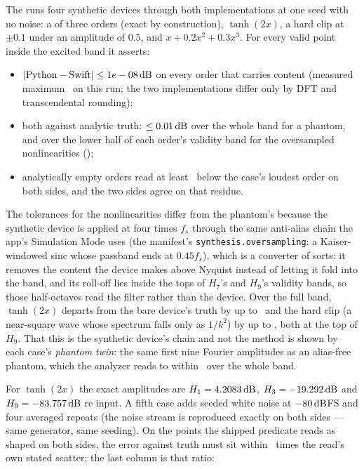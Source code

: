 \documentclass[11pt,a4paper]{article}
\begin{document}
The  runs four synthetic devices through both
implementations at one seed with no noise: a  of three orders
(exact by construction), $\tanh(2x)$, a hard clip at $\pm 0.1$ under an
amplitude of $0.5$, and $x + 0.2x^2 + 0.3x^3$. \machineFloorNote{} For
every valid point inside the excited band it asserts:
\begin{itemize}
  \item $|\text{Python} - \text{Swift}| \le 1e-08\,\mathrm{dB}$ on every
  order that carries content (measured maximum \parityWorstSwift\dB\ on
  this run; the two implementations differ only by DFT and transcendental
  rounding);
  \item both against analytic truth: $\le 0.01\,\mathrm{dB}$ over
  the whole band for a phantom, and over the lower half of each order's
  validity band for the oversampled nonlinearities
  (\parityPerSampleTolerances);
  \item analytically empty orders read at least \parityEmptyDepth\dB\ below
  the case's loudest order on both sides, and the two sides agree on that
  residue.
\end{itemize}
The tolerances for the nonlinearities differ from the phantom's because
the synthetic device is applied at four times $f_s$ through the same
anti-alias chain the app's Simulation Mode uses (the manifest's
\texttt{synthesis.oversampling}: a Kaiser-windowed sinc whose passband ends
at $0.45 f_s$), which is a converter of sorts: it removes the content the
device makes above Nyquist instead of letting it fold into the band, and
its roll-off lies inside the tops of $H_7$'s and $H_9$'s validity bands,
so those half-octaves read the filter rather than the device. Over the
full band, $\tanh(2x)$ departs from the bare device's truth by up to
\parityTanhFullBand\dB\ and the hard clip (a near-square wave whose
spectrum falls only as $1/k^2$) by up to \parityHardclipFullBand\dB, both
at the top of $H_9$. That this is the synthetic device's chain and not the
method is shown by each case's \emph{phantom twin}: the same first nine
Fourier amplitudes as an alias-free phantom, which the analyzer reads to
within \parityAliasFreeTolerance\dB\ over the whole band.

{\small\parityTable}

For $\tanh(2x)$ the exact amplitudes are $H_1 = 4.2083\,\mathrm{dB}$,
$H_3 = -19.292\,\mathrm{dB}$ and $H_9 = -83.757\,\mathrm{dB}$ re input. A
fifth case adds seeded white noise at $-80\,\mathrm{dB}$FS and four averaged repeats
(the noise stream is reproduced exactly on both sides --- same generator,
same seeding). On the points the shipped predicate reads as shaped on both
sides, the error against truth must sit within \parityScatterMultiple\
times the read's own stated scatter; the last column is that ratio:
\end{document}
